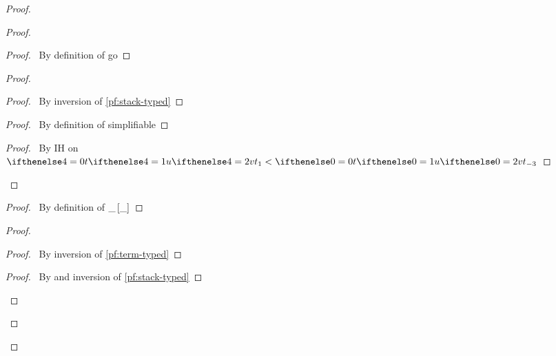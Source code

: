 \documentclass[a4paper]{article}
\begin{document}
\begin{proof}
\begin{proof}
\begin{proof}
      \pf\ By definition of \textsf{go}
    \end{proof}
     \begin{proof}
      \begin{proof}
        \pf\ By inversion of \ref{pf:stack-typed}
      \end{proof}
      \begin{proof}
        \pf\ By definition of simplifiable
      \end{proof}
      \qedstep
      \begin{proof}
        \pf\ By IH on $\aTerm[4] <  \aTerm$
      \end{proof}
    \end{proof}
    \begin{proof}
      \pf\ By definition of $\_ \left[ \_ \right]$
    \end{proof}
    \begin{proof}
      \begin{proof}
        \pf\ By inversion of \ref{pf:term-typed}
      \end{proof}
      \begin{proof}
        \pf\ By  and inversion of \ref{pf:stack-typed}
      \end{proof}

\end{proof}
\end{proof}
\end{proof}
\end{document}
